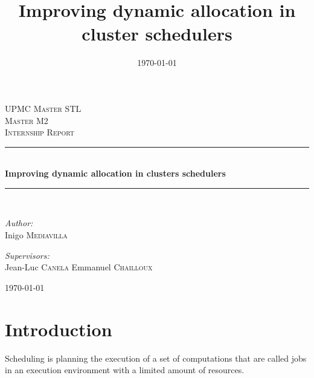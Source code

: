 \documentclass{report}                     %
\newcommand{\HRule}{\rule{\linewidth}{0.5mm}}
\begin{document}
\title{ Improving dynamic allocation in cluster schedulers }

\begin{titlepage}
\begin{center}


\textsc{\LARGE UPMC Master STL}\\[1.5cm]

\textsc{\Large Master M2 }\\[0.5cm]
\textsc{\Large Internship Report }\\[0.5cm]

\HRule \\[0.4cm]
{ \huge \bfseries Improving dynamic allocation in clusters schedulers  \\[0.4cm] }

\HRule \\[1.5cm]

\begin{minipage}{0.4\textwidth}
\begin{flushleft} \large
\emph{Author:}\\
Inigo \textsc{Mediavilla}
\end{flushleft}
\end{minipage}
\begin{minipage}{0.4\textwidth}
\begin{flushright} \large
\emph{Supervisors:} \\
Jean-Luc \textsc{Canela}
Emmanuel \textsc{Chailloux}
\end{flushright}
\end{minipage}

\vfill

{\large \today}

\end{center}
\end{titlepage}
\date{\today}


\tableofcontents

\chapter{Introduction}

Scheduling is planning the execution of a set of computations that
are called jobs in an execution environment with a limited amount of
resources.
\end{document}
